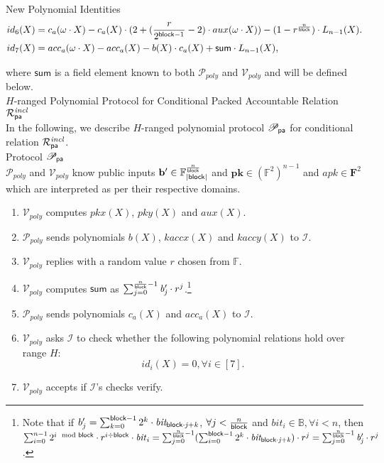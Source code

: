 \noindent \textsf{New Polynomial Identities} 
\begin{align*}
id_6(X) & =  c_{a}(\omega \cdot X) - c_{a}(X)\cdot (2+ (\frac{r}{2^{\mathsf{block} -1}} -2) \cdot aux(\omega \cdot X)) - (1 - r^{\frac{n}{\mathsf{block}}}) \cdot L_{n-1}(X).\\
id_7(X) & =  acc_{a}(\omega \cdot X) - acc_{a}(X) - b(X)\cdot c_{a}(X) + \mathsf{sum} \cdot L_{n-1}(X),
\end{align*}

\noindent where $\mathsf{sum}$ is a field element known to both $\mathcal{P}_{poly}$ and $\mathcal{V}_{poly}$ and will be defined below. \\ 

\noindent \textsf{$H$-ranged Polynomial Protocol for Conditional Packed Accountable Relation $\mathcal{R}^{\mathit{incl}}_{\mathsf{pa}}$} \\

\noindent In the following, we describe $H$-ranged polynomial protocol $\mathscr{P}_{\mathsf{pa}}$ for conditional relation 
$\mathcal{R}^{\mathit{incl}}_{\mathsf{pa}}$. \\

\noindent \textsf{Protocol $\mathscr{P}_{\mathsf{pa}}$} \\

\noindent $\mathcal{P}_{poly}$ and $\mathcal{V}_{poly}$ know public inputs 
$\mathbf{b'} \in \mathbb{F}_{|\mathsf{block}|}^{\frac{n}{\mathsf{block}}}$ and 
$\mathbf{pk} \in (\mathbb{F}^2)^{n-1} $ and $\mathit{apk} \in \mathbf{F}^2$ which are interpreted as per their respective domains. \\

\begin{enumerate}
\item $\mathcal{V}_{poly}$ computes $pkx(X)$, $pky(X)$ and $aux(X)$.
\item $\mathcal{P}_{poly}$ sends polynomials $b(X)$, $kaccx(X)$ and $kaccy(X)$ to $\mathcal{I}$. 
\item $\mathcal{V}_{poly}$ replies with a random value $r$ chosen from $\mathbb{F}$. 
\item $\mathcal{V}_{poly}$ computes $\mathsf{sum}$ as $\sum_{j=0}^{\frac{n}{\mathsf{block}}-1} \mathit{b'_{j}} \cdot r^j$.\footnote{Note that if 
$b'_{j} = \sum_{k=0}^{\mathsf{block} -1}2^k \cdot \mathit{bit_{\mathsf{block} \cdot j + k }}$, $\forall j < \frac{n}{\mathsf{block}}$ and $\mathit{bit_i} \in \mathbb{B}, \forall i <n$, 
then $\sum_{i=0}^{n-1} 2^{i \mod {\mathsf{block}}} \cdot r^{i \div \mathsf{block}} \cdot \mathit{bit}_{i} = \sum_{j=0}^{\frac{n}{\mathsf{block}}-1}(\sum_{i=0}^{\mathsf{block} -1}2^k \cdot \mathit{bit_{\mathsf{block} \cdot j + k }}) \cdot r^j= \sum_{j=0}^{\frac{n}{\mathsf{block}}-1} \mathit{b'_{j}} \cdot r^j$.}
\item $\mathcal{P}_{poly}$ sends polynomials $c_{a}(X)$ and $acc_{a}(X)$ to $\mathcal{I}$. 
\item $\mathcal{V}_{poly}$ asks $\mathcal{I}$ to check whether the following polynomial relations hold over range $H$: 
$$id_i(X) = 0, \forall i \in [7].$$
\item $\mathcal{V}_{poly}$ accepts if $\mathcal{I}$'s checks verify. 
\end{enumerate}

